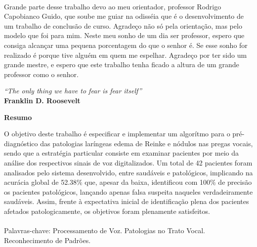 \documentclass[a4paper,12pt,oneside]{report}
\begin{document}
\\
\par Grande parte desse trabalho devo ao meu orientador, professor Rodrigo Capobianco Guido, que soube me guiar na odiss\'{e}ia que \'{e} o desenvolvimento de um trabalho de conclus\~{a}o de curso. Agrade\c{c}o n\~{a}o s\'{o} pela orienta\c{c}\~{a}o, mas pelo mo\-de\-lo que foi para mim. Neste meu sonho de um dia ser professor, espero que consiga alcan\c{c}ar uma pequena porcentagem do que o senhor \'{e}. Se esse sonho for realizado \'{e} porque tive algu\'{e}m em quem me espelhar. Agrade\c{c}o por ter sido um grande mestre, e espero que este trabalho tenha ficado a altura de um grande professor como o senhor. 
\newpage
\vspace*{+550pt}
\thispagestyle{empty}
\begin{flushright}
\textit{``The only thing we have to fear is fear itself''}
\\
\textbf{Franklin D. Roosevelt}
\end{flushright}
\newpage
\thispagestyle{empty}
\noindent
\begin{center}\textbf{\huge{Resumo}}\end{center} 
\vspace*{+60pt}
\vspace*{+20pt}
O objetivo deste trabalho \'{e} especificar e implementar um algor\'{i}tmo para o pr\'{e}-diagn\'{o}stico das patologias lar\'{i}ngeas edema de Reinke e n\'{o}dulos nas pregas vocais, sendo que a estrat\'{e}gia particular consiste em examinar pacientes por meio da an\'{a}lise dos respectivos sinais de voz digitalizados. Um total de 42 pacientes foram analisados pelo sistema desenvolvido, entre saud\'{a}veis e patol\'{o}gicos, implicando na acur\'{a}cia global de 52.38\% que, apesar da baixa, identificou com 100\% de precis\~{a}o os pacientes patol\'{o}gicos, lan\c{c}ando apenas falsa suspeita naqueles verdadeiramente saud\'{a}veis. Assim, frente \`{a} expectativa inicial de identifica\c{c}\~{a}o plena dos pacientes afetados patologicamente, os objetivos foram plenamente satisfeitos.  
\\
\\
Palavras-chave: Processamento de Voz. Patologias no Trato Vocal. Reconhecimento de Padr\~{o}es.
\end{document}
